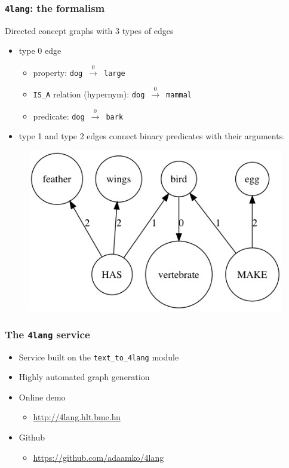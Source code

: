 \documentclass[bigger]{beamer}
\newcommand{\tefl}{\texttt{text\_to\_4lang}\xspace}
\newcommand{\fl}{\texttt{4lang}\xspace}
\begin{document}
{

\begin{frame}
    \frametitle{\fl: the formalism \citep{Kornai:2010,Kornai:2015a}}
\pause Directed concept graphs with 3 types of edges 
\begin{itemize}
    \pause \item type 0 edge
        \begin{itemize}
            \pause \item property: \texttt{dog}~$\xrightarrow0$~\texttt{large}
            \pause \item \texttt{IS\_A} relation (hypernym): \texttt{dog}~$\xrightarrow0$~\texttt{mammal}
            \pause \item predicate: \texttt{dog}~$\xrightarrow0$~\texttt{bark}
        \end{itemize}
    \pause \item type 1 and type 2 edges connect binary predicates with their arguments.
\end{itemize}
\pause \begin{figure}
\centering
    \includegraphics[scale=0.385]{pics/bird.jpg}
\end{figure}
\end{frame}
}
\begin{frame}
\frametitle{The \fl service}
		\begin{itemize}
			\pause \item Service built on the \tefl module
			\pause \item Highly automated graph generation
			\pause \item Online demo
			\begin{itemize}
				 \item \url{http://4lang.hlt.bme.hu}
			\end{itemize}
			\pause \item Github
			\begin{itemize}
				\item \url{https://github.com/adaamko/4lang}
			\end{itemize}
		\end{itemize}

\end{frame}
\end{document}
